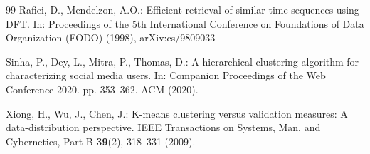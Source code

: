 \documentclass[11pt]{article}
\theoremstyle{remark}\newtheorem{remark}{Remark}\renewcommand{\theremark}{S\arabic{remark}}
\begin{document}
\begin{thebibliography}{99}
Rafiei, D., Mendelzon, A.O.: Efficient retrieval of similar time sequences
  using {DFT}. In: Proceedings of the 5th International Conference on
  Foundations of Data Organization (FODO) (1998), arXiv:cs/9809033

Sinha, P., Dey, L., Mitra, P., Thomas, D.: A hierarchical clustering algorithm
  for characterizing social media users. In: Companion Proceedings of the Web
  Conference 2020. pp. 353--362. ACM (2020). 

Xiong, H., Wu, J., Chen, J.: K-means clustering versus validation measures: A
  data-distribution perspective. IEEE Transactions on Systems, Man, and
  Cybernetics, Part B  \textbf{39}(2),  318--331 (2009).

\end{thebibliography}
\end{document}
